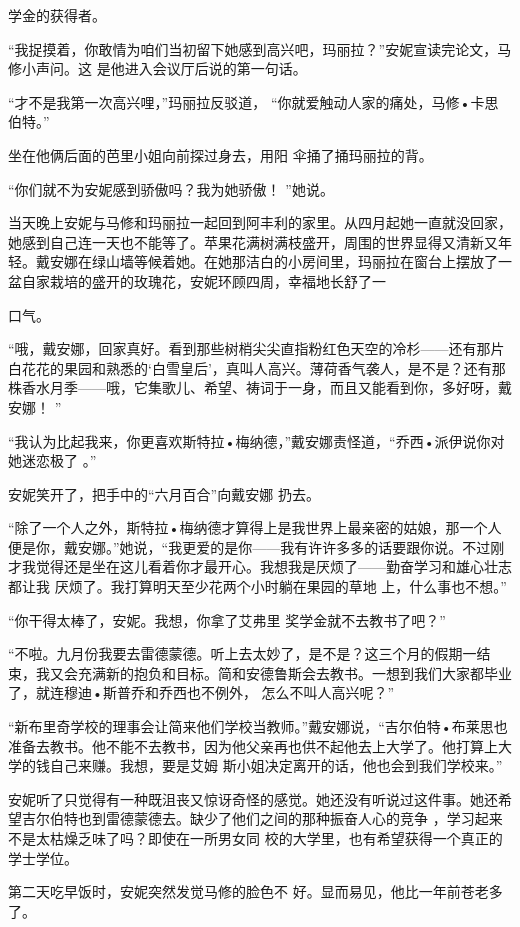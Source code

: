 \documentclass{article}
\begin{document}
学金的获得者。 

“我捉摸着，你敢情为咱们当初留下她感到高兴吧，玛丽拉？”安妮宣读完论文，马修小声问。这
是他进入会议厅后说的第一句话。 

“才不是我第一次高兴哩，”玛丽拉反驳道，
“你就爱触动人家的痛处，马修•卡思伯特。” 

坐在他俩后面的芭里小姐向前探过身去，用阳
伞捅了捅玛丽拉的背。 

“你们就不为安妮感到骄傲吗？我为她骄傲！
”她说。 

当天晚上安妮与马修和玛丽拉一起回到阿丰利的家里。从四月起她一直就没回家，她感到自己连一天也不能等了。苹果花满树满枝盛开，周围的世界显得又清新又年轻。戴安娜在绿山墙等候着她。在她那洁白的小房间里，玛丽拉在窗台上摆放了一盆自家栽培的盛开的玫瑰花，安妮环顾四周，幸福地长舒了一
\newpage

口气。 

“哦，戴安娜，回家真好。看到那些树梢尖尖直指粉红色天空的冷杉——还有那片白花花的果园和熟悉的‘白雪皇后’，真叫人高兴。薄荷香气袭人，是不是？还有那株香水月季——哦，它集歌儿、希望、祷词于一身，而且又能看到你，多好呀，戴安娜！
” 

“我认为比起我来，你更喜欢斯特拉•梅纳德，”戴安娜责怪道，“乔西•派伊说你对她迷恋极了
。” 

安妮笑开了，把手中的“六月百合”向戴安娜
扔去。 

“除了一个人之外，斯特拉•梅纳德才算得上是我世界上最亲密的姑娘，那一个人便是你，戴安娜。”她说，“我更爱的是你——我有许许多多的话要跟你说。不过刚才我觉得还是坐在这儿看着你才最开心。我想我是厌烦了——勤奋学习和雄心壮志都让我
\newpage
厌烦了。我打算明天至少花两个小时躺在果园的草地
上，什么事也不想。” 

“你干得太棒了，安妮。我想，你拿了艾弗里
奖学金就不去教书了吧？” 

“不啦。九月份我要去雷德蒙德。听上去太妙了，是不是？这三个月的假期一结束，我又会充满新的抱负和目标。简和安德鲁斯会去教书。一想到我们大家都毕业了，就连穆迪•斯普乔和乔西也不例外，
怎么不叫人高兴呢？” 

“新布里奇学校的理事会让简来他们学校当教师。”戴安娜说，“吉尔伯特•布莱思也准备去教书。他不能不去教书，因为他父亲再也供不起他去上大学了。他打算上大学的钱自己来赚。我想，要是艾姆
斯小姐决定离开的话，他也会到我们学校来。” 

安妮听了只觉得有一种既沮丧又惊讶奇怪的感觉。她还没有听说过这件事。她还希望吉尔伯特也到雷德蒙德去。缺少了他们之间的那种振奋人心的竞争
\newpage
，学习起来不是太枯燥乏味了吗？即使在一所男女同
校的大学里，也有希望获得一个真正的学士学位。 

第二天吃早饭时，安妮突然发觉马修的脸色不
好。显而易见，他比一年前苍老多了。 
\end{document}
